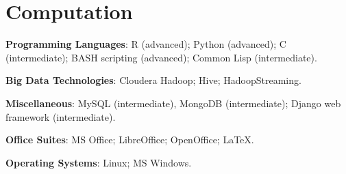 \documentclass[a4paper,11pt]{article}
\renewenvironment{itemize}{
\begin{list}{}{
  \setlength{\leftmargin}{1.5em}
  }
  }{
\end{list}
}
\begin{document}
\section*{Computation}
\begin{itemize}
  \item \textbf{Programming Languages}: R (advanced); Python (advanced); C
    (intermediate); BASH scripting (advanced); Common Lisp (intermediate).
  \item \textbf{Big Data Technologies}: Cloudera Hadoop; Hive; HadoopStreaming.
  \item \textbf{Miscellaneous}: MySQL (intermediate), MongoDB (intermediate);
    Django web framework (intermediate).
  \item \textbf{Office Suites}: MS Office; LibreOffice; OpenOffice; \LaTeX{}.
  \item \textbf{Operating Systems}: Linux; MS Windows.
\end{itemize}
\end{document}
